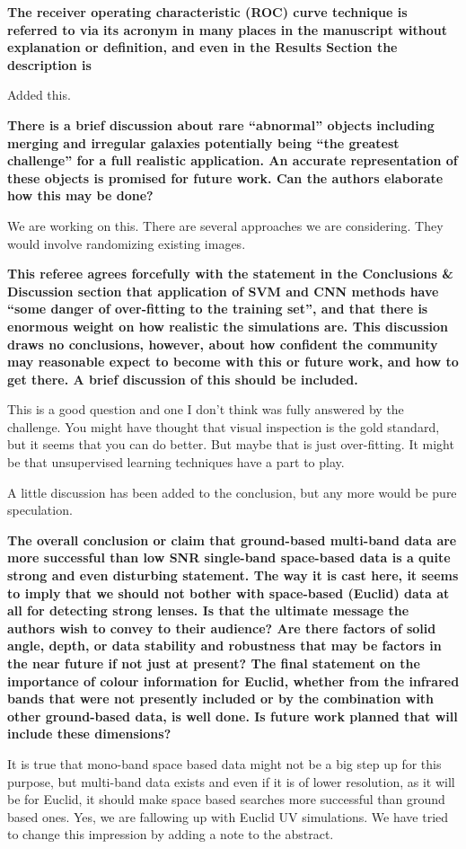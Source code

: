 \documentclass[11pt,a4paper]{article}
\begin{document}
{\bf
The receiver operating characteristic (ROC) curve technique is referred to via its acronym in many places in the manuscript without explanation or definition, and even in the Results Section the description is 
}

Added this.

{\bf
There is a brief discussion about rare “abnormal” objects including merging and irregular galaxies potentially being “the greatest challenge” for a full realistic application. 
An accurate representation of these objects is promised for future work. Can the authors elaborate how this may be done? 
}

We are working on this.  There are several approaches we are considering.  They would 
involve randomizing existing images.

{\bf
This referee agrees forcefully with the statement in the Conclusions \& Discussion section that application of SVM and CNN methods have “some danger of over-fitting to the training set”, and that there is enormous weight on how realistic the simulations are.  This discussion draws no conclusions, however, about how confident the community may reasonable expect to become with this or future work, and how to get there.  A brief discussion of this should be included.  
}

This is a good question and one I don't think was fully answered by the challenge.  You might have 
thought that visual inspection is the gold standard, but it seems that you can do better.  But maybe 
that is just over-fitting.  It might be that unsupervised learning techniques have a part to play.  

A little discussion has been added to the conclusion, but any more would be pure speculation.

{\bf
The overall conclusion or claim that ground-based multi-band data are more successful than low SNR single-band space-based data is a quite strong and even disturbing statement.  The way it is cast here, it seems to imply that we should not bother with space-based (Euclid) data at all for detecting strong lenses.  Is that the ultimate message the authors wish to convey to their audience?  Are there factors of solid angle, depth, or data stability and robustness that may be factors in the near future if not just at present?  The final statement on the importance of colour information for Euclid, whether from the infrared bands that were not presently included or by the combination with other ground-based data, is well done. Is future work planned that will include these dimensions? 
}

It is true that mono-band space based data might not be a big step up for this purpose, but 
multi-band data exists and even if it is of lower resolution, as it will be for Euclid, it should 
make space based searches more successful than ground based ones.  Yes, we are fallowing 
up with Euclid UV simulations.  We have tried to change this impression by adding a note to the abstract.
\end{document}

